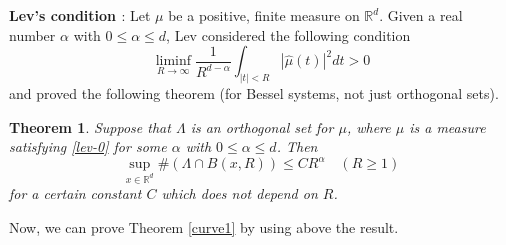 \documentclass[12pt,a4paper,intlimits,sumlimits]{amsart}
\theoremstyle{plain}
\newtheorem{theorem}{Theorem}
\theoremstyle{definition}
\newcounter{rem}
\begin{document}
 \textbf{Lev's condition  \cite[Lemma 3.1.]{Lev18}}:  Let $\mu$ be a positive, finite measure on $\mathbb{R}^d$. Given a real number $\alpha$ with $0 \leqslant \alpha \leqslant d$, Lev considered  the following condition
 \begin{equation}\label{lev-0}
 \liminf _{R \rightarrow \infty} \frac{1}{R^{d-\alpha}} \int_{|t|<R}|\widehat{\mu}(t)|^2 d t>0
 \end{equation}
 and proved the following  theorem  (for Bessel systems, not just orthogonal sets).
 \begin{theorem}\cite[Lemma 3.1.]{Lev18}\label{lev-1}
 Suppose that $\Lambda$ is an orthogonal set for $\mu$, where $\mu$ is a measure satisfying \eqref{lev-0} for some $\alpha$ with $0 \leqslant \alpha \leqslant d$. Then
$$
 \sup _{x \in \mathbb{R}^d} \#(\Lambda \cap B(x, R)) \leqslant C R^\alpha \quad(R\geqslant 1)
$$
 for a certain constant $C$ which does not depend on $R$.
 \end{theorem}
 Now, we can prove Theorem \ref{curve1} by using above the result.
\end{document}
